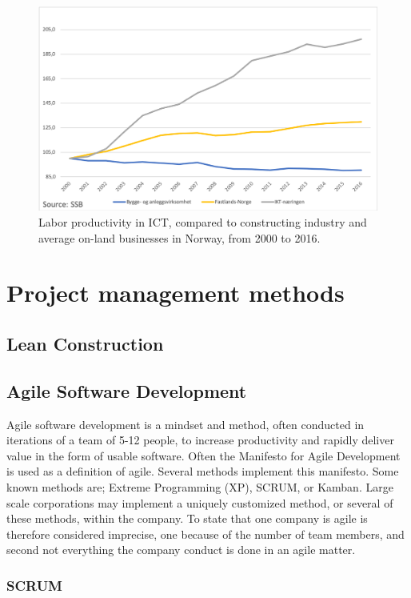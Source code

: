 \begin{figure}
    \centering
    \includegraphics[width=\textwidth]{fig/ba_on-land_ICT.png}
    \caption{Labor productivity in ICT, compared to constructing industry and average on-land businesses in Norway, from 2000 to 2016.}
    \label{fig:LP_ICT_VS}
\end{figure}

\section{Project management methods}
\subsection{Lean Construction} \label{sec:lean_construction}
\subsection{Agile Software Development}
Agile software development is a mindset and method, often conducted in iterations of a team of 5-12 people, to increase productivity and rapidly deliver value in the form of usable software. Often the Manifesto for Agile Development is used as a definition of agile. Several methods implement this manifesto. Some known methods are; Extreme Programming (XP), SCRUM, or Kamban. Large scale corporations may implement a uniquely customized method, or several of these methods, within the company. To state that one company is agile is therefore considered imprecise, one because of the number of team members, and second not everything the company conduct is done in an agile matter.
\subsubsection{SCRUM}

